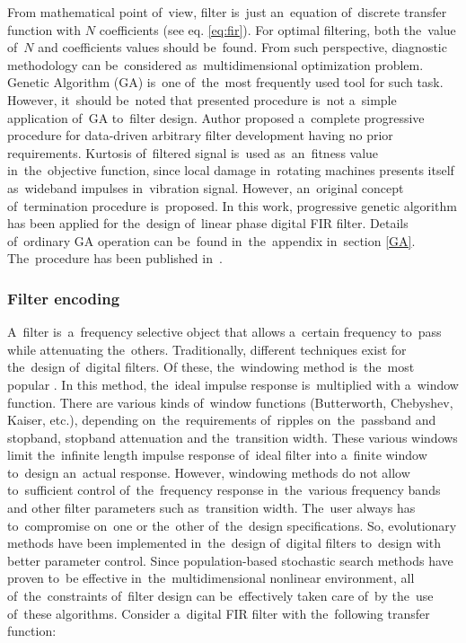 From mathematical point of~view, filter is~just an~equation of~discrete transfer function with $N$ coefficients (see eq. \ref{eq:fir}). For optimal filtering, both the~value of~$N$ and coefficients values should be~found. From such perspective, diagnostic methodology can be~considered as~multidimensional optimization problem. Genetic Algorithm (GA) is~one of~the~most frequently used tool for such task. However, it~should be~noted that presented procedure is~not a~simple application of~GA to~filter design. Author proposed a~complete progressive procedure for data-driven arbitrary filter development having no prior requirements. Kurtosis of~filtered signal is~used as~an~fitness value in~the~objective function, since local damage in~rotating machines presents itself as~wideband impulses in~vibration signal. However, an~original concept of~termination procedure is~proposed. In this work, progressive genetic algorithm has been applied for the~design of~linear phase digital FIR filter. Details of~ordinary GA operation can be~found in~the~appendix in~section \ref{GA}. The~procedure has been published in~\cite{wodecki2018optimal}.

\subsubsection{Filter encoding}

A~filter is~a~frequency selective object that allows a~certain frequency to~pass while attenuating the~others. Traditionally, different techniques exist for the~design of~digital filters. Of these, the~windowing method is~the~most popular \cite{alan1989discrete}. In this method, the~ideal impulse response is~multiplied with a~window function. There are various kinds of~window functions (Butterworth, Chebyshev, Kaiser, etc.), depending on~the~requirements of~ripples on~the~passband and stopband, stopband attenuation and the~transition width. These various windows limit the~infinite length impulse response of~ideal filter into a~finite window to~design an~actual response. However, windowing methods do not allow to~sufficient control of~the~frequency response in~the~various frequency bands and other filter parameters such as~transition width. The~user always has to~compromise on~one or the~other of~the~design specifications. So, evolutionary methods have been implemented in~the~design of~digital filters to~design with better parameter control. Since population-based stochastic search methods have proven to~be effective in~the~multidimensional nonlinear environment, all of~the~constraints of~filter design can be~effectively taken care of~by the~use of~these algorithms. 
Consider a~digital FIR filter with the~following transfer function:

